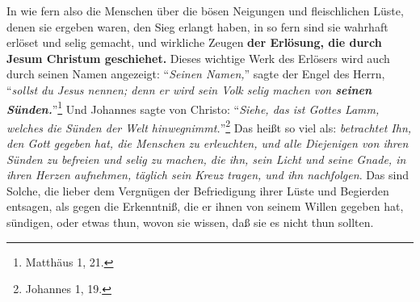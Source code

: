 In wie fern also die Menschen über die bösen Neigungen und fleischlichen Lüste, denen sie ergeben waren, den Sieg erlangt haben, in so fern sind sie wahrhaft erlöset und selig gemacht, und wirkliche Zeugen \textbf{der Erlösung, die durch Jesum Christum geschiehet.}
Dieses wichtige Werk des Erlösers wird auch durch seinen Namen angezeigt: "`\textit{Seinen Namen,}"' sagte der Engel des Herrn, "`\textit{sollst du Jesus nennen; denn er wird sein Volk selig machen von \textbf{seinen Sünden.}}"'\footnote{Matthäus 1, 21.} 
Und Johannes sagte von Christo: "`\textit{Siehe, das ist Gottes Lamm, welches die Sünden der Welt hinwegnimmt.}"'\footnote{Johannes 1, 19.} 
Das heißt so viel als:
\textit{betrachtet Ihn, den Gott gegeben hat, die Menschen zu erleuchten, und alle Diejenigen von ihren Sünden zu befreien und selig zu machen, die ihn, sein Licht und seine Gnade, in ihren Herzen aufnehmen, täglich sein Kreuz tragen, und ihn nachfolgen}.
Das sind Solche, die lieber dem Vergnügen der Befriedigung ihrer Lüste und Begierden entsagen, als gegen die Erkenntniß, die er ihnen von seinem Willen gegeben hat, sündigen, oder etwas thun, wovon sie wissen, daß sie es nicht thun sollten.




